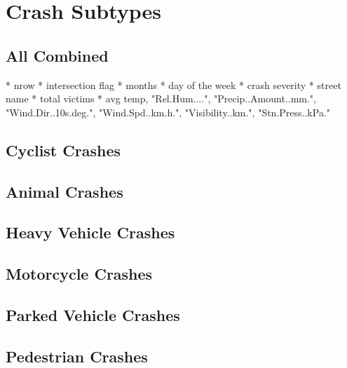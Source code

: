 \documentclass[11pt, a4paper]{article}
\begin{document}
\section{Crash Subtypes}

\subsection{All Combined}

* nrow
* intersection flag
* months
* day of the week
* crash severity
* street name
* total victims
* avg temp, "Rel.Hum....", "Precip..Amount..mm.", 
"Wind.Dir..10s.deg.", "Wind.Spd..km.h.", "Visibility..km.", "Stn.Press..kPa."


\pagebreak
\subsection{Cyclist Crashes}








\pagebreak
\subsection{Animal Crashes}




\pagebreak
\subsection{Heavy Vehicle Crashes}




\pagebreak
\subsection{Motorcycle Crashes}




\pagebreak
\subsection{Parked Vehicle Crashes}





\pagebreak
\subsection{Pedestrian Crashes}











\pagebreak
\section{}
\end{document}
